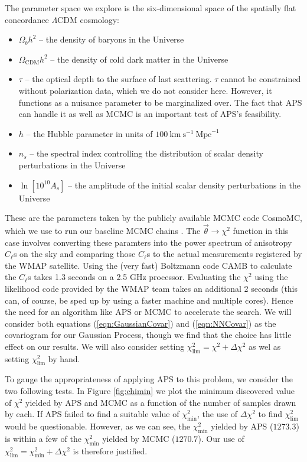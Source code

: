 \documentclass[useAMS,usenatbib]{aastex}
\begin{document}
The parameter space we explore is the six-dimensional space of the spatially
flat concordance $\Lambda$CDM cosmology:
\begin{itemize}
\item$\Omega_bh^2$ -- the density of baryons in the Universe
\\
\item$\Omega_\text{CDM}h^2$ -- the density of cold dark matter in the Universe
\\
\item$\tau$ -- the optical depth to the surface of last scattering.  $\tau$ cannot be
constrained without polarization data, which we do not consider here.  However, it functions
as a nuisance parameter to be marginalized over.  The fact that APS can handle it as well as
MCMC is an important test of APS's feasibility.
\\
\item$h$ -- the Hubble parameter in units of
$100~\text{km}~\text{s}^{-1}~\text{Mpc}^{-1}$
\\
\item$n_s$ -- the spectral index controlling the distribution of scalar density
perturbations in the Universe
\\
\item$\ln[10^{10}A_s]$ -- the amplitude of the initial scalar density
perturbations in the Universe
\end{itemize}
These are the parameters taken by the publicly available MCMC code CosmoMC,
which we use to run our baseline MCMC chains \cite{cosmomc}.  The
$\vec{\theta}\rightarrow\chi^2$ function in this case involves converting these
paramters into the power spectrum of anisotropy $C_\ell$s on the sky and
comparing those $C_\ell$s to the actual measurements registered by the WMAP
satellite.  Using the (very fast) Boltzmann code CAMB to calculate the $C_\ell$s
\cite{camb} takes 1.3 seconds on a 2.5 GHz processor.  
Evaluating the $\chi^2$ using the likelihood code provided by the WMAP team
\cite{wmap7likelihood} takes an additional 2 seconds (this can, of course, be sped up by using a faster
machine and multiple cores).  Hence the need
for an algorithm like APS or MCMC to accelerate the search.
We will consider both equations (\ref{eqn:GaussianCovar}) and (\ref{eqn:NNCovar})
as the covariogram for our Gaussian Process, 
though we find that the choice has little effect on our
results.  We will also consider setting $\chi^2_\text{lim}=\chi^2+\Delta\chi^2$ 
as wel as setting $\chi^2_\text{lim}$ by hand.

To gauge the appropriateness of applying APS to this problem, we consider
the two following tests.  In Figure \ref{fig:chimin} we plot the minimum discovered value
of $\chi^2$ yielded by APS and MCMC as a function of the number of samples drawn
by each.  If APS failed to find a suitable value of $\chi^2_\text{min}$, the use of
$\Delta\chi^2$  to find $\chi^2_\text{lim}$ would be questionable.  However, as we can see,
the $\chi^2_\text{min}$ yielded by APS ($1273.3$) 
is within a few of the $\chi^2_\text{min}$ yielded
by MCMC ($1270.7$).  Our use of $\chi^2_\text{lim}=\chi^2_\text{min}+\Delta\chi^2$ is therefore
justified.
\end{document}
